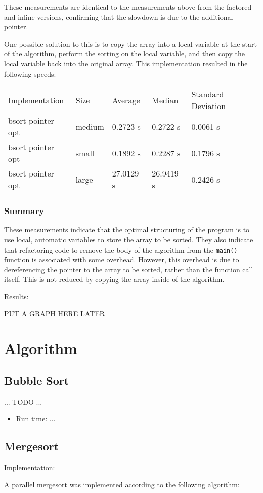 \documentclass{article}
\begin{document}
These measurements are identical to the measurements above from the
factored and inline versions, confirming that the slowdown is due to
the additional pointer.

One possible solution to this is to copy the array into a local
variable at the start of the algorithm, perform the sorting on the
local variable, and then copy the local variable back into the
original array. This implementation resulted in the following speeds:

\begin{center}
\begin{tabular}{lllll}
 Implementation     &  Size    &  Average    &  Median     &  Standard Deviation  \\
 bsort pointer opt  &  medium  &  0.2723 s   &  0.2722 s   &  0.0061 s            \\
 bsort pointer opt  &  small   &  0.1892 s   &  0.2287 s   &  0.1796 s            \\
 bsort pointer opt  &  large   &  27.0129 s  &  26.9419 s  &  0.2426 s            \\
\end{tabular}
\end{center}

\subsubsection{Summary}
These measurements indicate that the optimal structuring of the
program is to use local, automatic variables to store the array to be
sorted. They also indicate that refactoring code to remove the body of
the algorithm from the \texttt{main()} function is associated with
some overhead. However, this overhead is due to dereferencing the
pointer to the array to be sorted, rather than the function call
itself. This is not reduced by copying the array inside of the algorithm.

Results:

PUT A GRAPH HERE LATER


\section{Algorithm}
\subsection{Bubble Sort}
... TODO ...
\begin{itemize}
\item Run time: ...
\end{itemize}

\subsection{Mergesort}
Implementation:

A parallel mergesort was implemented according to the following
algorithm:

  



\nocite{*}
\end{document}
